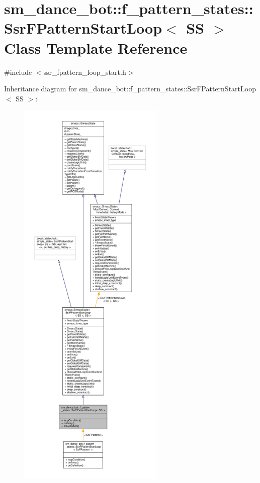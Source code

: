 \hypertarget{structsm__dance__bot_1_1f__pattern__states_1_1SsrFPatternStartLoop}{}\section{sm\+\_\+dance\+\_\+bot\+:\+:f\+\_\+pattern\+\_\+states\+:\+:Ssr\+F\+Pattern\+Start\+Loop$<$ SS $>$ Class Template Reference}
\label{structsm__dance__bot_1_1f__pattern__states_1_1SsrFPatternStartLoop}


{\ttfamily \#include $<$ssr\+\_\+fpattern\+\_\+loop\+\_\+start.\+h$>$}



Inheritance diagram for sm\+\_\+dance\+\_\+bot\+:\+:f\+\_\+pattern\+\_\+states\+:\+:Ssr\+F\+Pattern\+Start\+Loop$<$ SS $>$\+:\nopagebreak
\begin{figure}[H]
\begin{center}
\leavevmode
\includegraphics[height=550pt]{structsm__dance__bot_1_1f__pattern__states_1_1SsrFPatternStartLoop__inherit__graph}
\end{center}
\end{figure}


